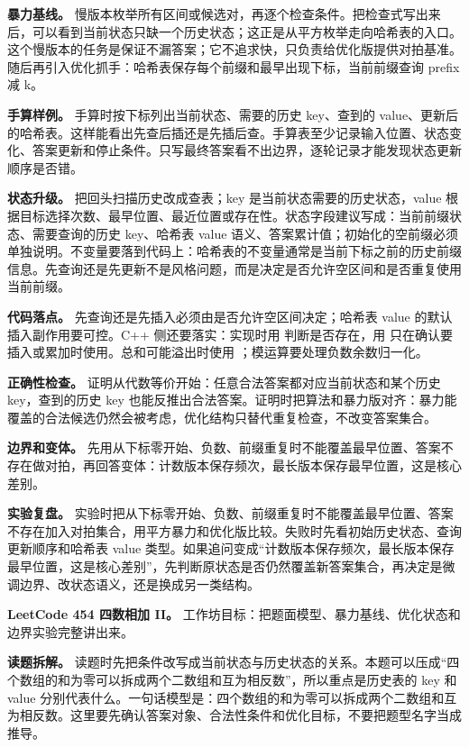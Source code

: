 \textbf{暴力基线。} 慢版本枚举所有区间或候选对，再逐个检查条件。把检查式写出来后，可以看到当前状态只缺一个历史状态；这正是从平方枚举走向哈希表的入口。这个慢版本的任务是保证不漏答案；它不追求快，只负责给优化版提供对拍基准。随后再引入优化抓手：哈希表保存每个前缀和最早出现下标，当前前缀查询 prefix 减 k。

\textbf{手算样例。} 手算时按下标列出当前状态、需要的历史 key、查到的 value、更新后的哈希表。这样能看出先查后插还是先插后查。手算表至少记录输入位置、状态变化、答案更新和停止条件。只写最终答案看不出边界，逐轮记录才能发现状态更新顺序是否错。

\textbf{状态升级。} 把回头扫描历史改成查表；key 是当前状态需要的历史状态，value 根据目标选择次数、最早位置、最近位置或存在性。状态字段建议写成：当前前缀状态、需要查询的历史 key、哈希表 value 语义、答案累计值；初始化的空前缀必须单独说明。不变量要落到代码上：哈希表的不变量通常是当前下标之前的历史前缀信息。先查询还是先更新不是风格问题，而是决定是否允许空区间和是否重复使用当前前缀。

\textbf{代码落点。} 先查询还是先插入必须由是否允许空区间决定；哈希表 value 的默认插入副作用要可控。C++ 侧还要落实：实现时用  判断是否存在，用  只在确认要插入或累加时使用。总和可能溢出时使用 ；模运算要处理负数余数归一化。

\textbf{正确性检查。} 证明从代数等价开始：任意合法答案都对应当前状态和某个历史 key，查到的历史 key 也能反推出合法答案。证明时把算法和暴力版对齐：暴力能覆盖的合法候选仍然会被考虑，优化结构只替代重复检查，不改变答案集合。

\textbf{边界和变体。} 先用从下标零开始、负数、前缀重复时不能覆盖最早位置、答案不存在做对拍，再回答变体：计数版本保存频次，最长版本保存最早位置，这是核心差别。

\textbf{实验复盘。} 实验时把从下标零开始、负数、前缀重复时不能覆盖最早位置、答案不存在加入对拍集合，用平方暴力和优化版比较。失败时先看初始历史状态、查询更新顺序和哈希表 value 类型。如果追问变成“计数版本保存频次，最长版本保存最早位置，这是核心差别”，先判断原状态是否仍然覆盖新答案集合，再决定是微调边界、改状态语义，还是换成另一类结构。

\noindent\textbf{LeetCode 454 四数相加 II。} 工作坊目标：把题面模型、暴力基线、优化状态和边界实验完整讲出来。

\textbf{读题拆解。} 读题时先把条件改写成当前状态与历史状态的关系。本题可以压成“四个数组的和为零可以拆成两个二数组和互为相反数”，所以重点是历史表的 key 和 value 分别代表什么。一句话模型是：四个数组的和为零可以拆成两个二数组和互为相反数。这里要先确认答案对象、合法性条件和优化目标，不要把题型名字当成推导。

